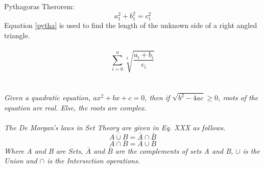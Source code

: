 \documentclass{article}
\begin{document}
Pythagoras Therorem:
	\begin{equation}
		\label{pytha}
		a_1^2 + b_1^2 = c_1^2
	\end{equation}
	Equation \ref{pytha} is used to find the length of the unknown side of a right angled triangle.
	\\
	\\
	\begin{equation}
		\label{eq2}
		\sum_{i=0}^{n} \sqrt[3]{\frac{a_i + b_i}{c_i}}
	\end{equation}
	\\
	\\
	\textit{Given a quadratic equation, $ax^2+bx+c=0$, then if $\sqrt{b^2-4ac}\geq0 $, roots of the equation are real. Else, the roots are complex.}
	\\
	\\
	\textit{The De Morgan's laws in Set Theory are given in Eq. XXX as follows.}
	$$\overline{A \cup B} = \bar{A} \cap \bar{B}$$
	$$\overline{A \cap B} = \bar{A} \cup \bar{B} $$
	\textit{Where A and B are Sets, $\bar{A}$ and $\bar{B}$ are the complements of sets A and B, $\cup$ is the Union and $\cap$ is the Intersection operations.}
\end{document}
